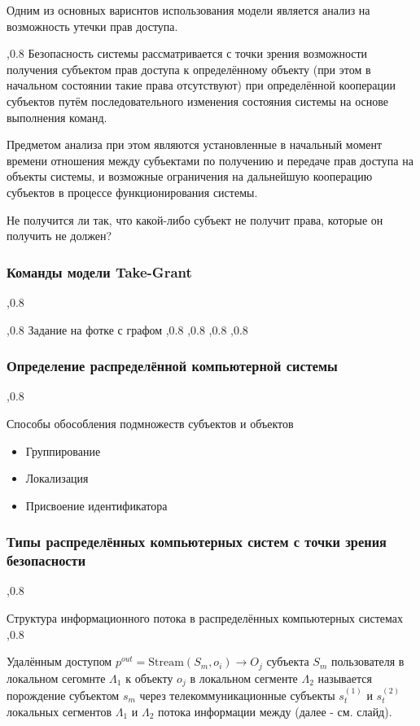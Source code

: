 \documentclass[a4paper,12pt]{report}
\begin{document}
	Одним из основных вариснтов использования модели является анализ на возможность утечки прав доступа.

	,0.8
	Безопасность системы рассматривается с точки зрения возможности получения субъектом прав доступа к определённому объекту (при этом в начальном состоянии такие права отсутствуют) при определённой кооперации субъектов путём последовательного изменения состояния системы на основе выполнения команд.

	Предметом анализа при этом являются установленные в начальный момент времени отношения между субъектами по получению и передаче прав доступа на объекты системы, и возможные ограничения на дальнейшую кооперацию субъектов в процессе функционирования системы.

	Не получится ли так, что какой-либо субъект не получит права, которые он получить не должен?

	\subsubsection{Команды модели Take-Grant}
	,0.8

	,0.8
	Задание на фотке с графом
	,0.8
	,0.8
	,0.8
	,0.8

	\subsubsection{Определение распределённой компьютерной системы}
	,0.8

	Способы обособления подмножеств субъектов и объектов
	\begin{itemize}
		\item Группирование
		\item Локализация
		\item Присвоение идентификатора
	\end{itemize}

	\subsubsection{Типы распределённых компьютерных систем с точки зрения безопасности}
	,0.8

	Структура информационного потока в распределённых компьютерных системах
	,0.8

	 Удалённым доступом $p^{out} = \mbox{Stream}(S_m,o_i) \rightarrow O_j$ субъекта $S_m$ пользователя в локальном сегомнте $\Lambda_1$ к объекту $o_j$ в локальном сегменте $\Lambda_2$ называется порождение субъектом $s_m$ через телекоммуникационные субъекты $s^{(1)}_t$ и $s^{(2)}_t$ локальных сегментов $\Lambda_1$ и $\Lambda_2$ потока информации между (далее - см. слайд).
\end{document}
